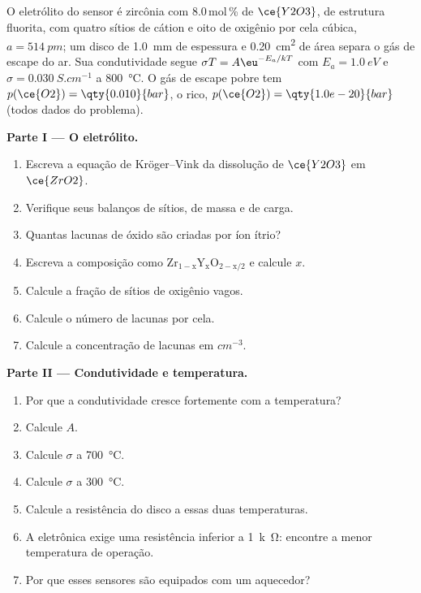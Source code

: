 \begin{problem}
\label{pb:b3:solid-state:1}
O eletrólito do sensor é zircônia com 8.0\,mol\,\% de $\ce{Y2O3}$, de estrutura fluorita,
com quatro sítios de cátion e oito de oxigênio por cela cúbica, $a = \qty{514}{pm}$; um disco
de \qty{1.0}{mm} de espessura e \qty{0.20}{cm^2} de área separa o gás de escape do ar. Sua
condutividade segue $\sigma T = A\eu^{-E_a/kT}$ com $E_a = \qty{1.0}{eV}$ e $\sigma = \qty{0.030}{S.cm^{-1}}$ a \qty{800}{\celsius}. O gás de escape
pobre tem $p(\ce{O2}) = \qty{0.010}{bar}$, o rico, $p(\ce{O2}) = \qty{1.0e-20}{bar}$ (todos dados do problema).

\medskip\noindent\textbf{Parte I --- O eletrólito.}
\begin{enumerate}
  \item Escreva a equação de Kröger--Vink da dissolução de $\ce{Y2O3}$ em $\ce{ZrO2}$.
  \item Verifique seus balanços de sítios, de massa e de carga.
  \item Quantas lacunas de óxido são criadas por íon ítrio?
  \item Escreva a composição como $\mathrm{Zr_{1-x}Y_xO_{2-x/2}}$ e calcule $x$.
  \item Calcule a fração de sítios de oxigênio vagos.
  \item Calcule o número de lacunas por cela.
  \item Calcule a concentração de lacunas em $\unit{cm^{-3}}$.
\end{enumerate}

\medskip\noindent\textbf{Parte II --- Condutividade e temperatura.}
\begin{enumerate}[resume]
  \item Por que a condutividade cresce fortemente com a temperatura?
  \item Calcule $A$.
  \item Calcule $\sigma$ a \qty{700}{\celsius}.
  \item Calcule $\sigma$ a \qty{300}{\celsius}.
  \item Calcule a resistência do disco a essas duas temperaturas.
  \item A eletrônica exige uma resistência inferior a \qty{1}{k\ohm}: encontre a menor
        temperatura de operação.
  \item Por que esses sensores são equipados com um aquecedor?
\end{enumerate}


\end{problem}
